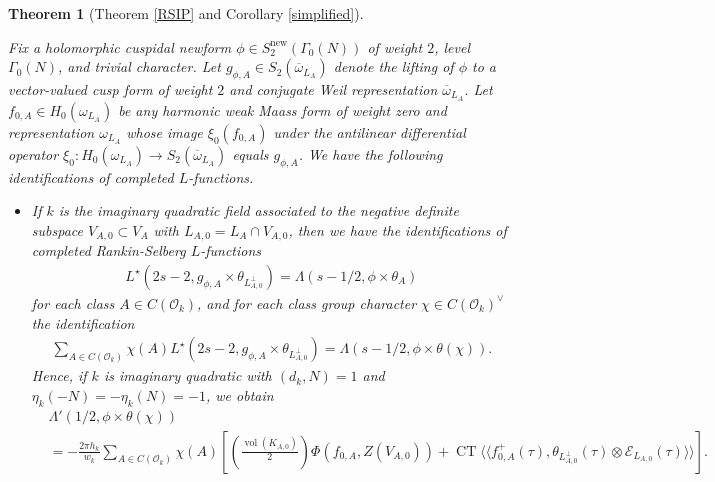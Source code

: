 \documentclass{amsart}
\newtheorem{theorem}{Theorem}[section]
\theoremstyle{definition}
\theoremstyle{definition}
\theoremstyle{definition}
\begin{document}
\begin{theorem}[Theorem \ref{RSIP} and Corollary \ref{simplified}]\label{Rankin-Selberg} 

Fix a holomorphic cuspidal newform $\phi \in S^{\operatorname{new}}_2(\Gamma_0(N))$ of weight $2$, level $\Gamma_0(N)$, and trivial character. 
Let $g_{\phi, A} \in S_2(\overline{\omega}_{L_A})$ denote the lifting of $\phi$ to a vector-valued cusp form of weight $2$ 
and conjugate Weil representation $\overline{\omega}_{L_A}$. Let $f_{0, A} \in H_{0}(\omega_{L_A})$ be any harmonic weak
Maass form of weight zero and representation $\omega_{L_A}$ whose image $\xi_0(f_{0, A})$ under the antilinear differential 
operator $\xi_0: H_0(\omega_{L_A}) \rightarrow S_2(\overline{\omega}_{L_A})$ equals $g_{\phi, A}$.
We have the following identifications of completed $L$-functions. \\

\begin{itemize}

\item[(i)] If $k$ is the imaginary quadratic field associated to the negative definite subspace $V_{A, 0} \subset V_A$
with $L_{A,0} = L_A \cap V_{A,0}$, then we have the identifications of completed Rankin-Selberg $L$-functions 
\begin{align*} L^{\star}(2s-2, g_{\phi, A} \times \theta_{L_{A, 0}^{\perp}}) 
= \Lambda(s-1/2, \phi \times \theta_A) \end{align*} 
for each class $A \in C(\mathcal{O}_k)$, and for each class group character $\chi \in C(\mathcal{O}_k)^{\vee}$ the identification 
\begin{align*} \sum\limits_{A \in C(\mathcal{O}_k)} \chi(A) L^{\star}(2s-2, g_{\phi, A} \times \theta_{L_{A, 0}^{\perp}}) 
= \Lambda(s-1/2, \phi \times \theta(\chi)). \end{align*} 
Hence, if $k$ is imaginary quadratic with $(d_k, N)=1$ and $\eta_k(-N) = -\eta_k(N) = -1$, we obtain 
\begin{align*} & \Lambda'(1/2, \phi \times \theta(\chi))  \\
&=- \frac{2 \pi h_k}{w_k} \sum\limits_{A \in C(\mathcal{O}_k)} \chi(A) 
\left[ \left(   \frac{\operatorname{vol}(K_{A,0})  }{ 2} \right) \Phi(f_{0, A}, Z(V_{A, 0})) 
+ \operatorname{CT} \langle \langle f_{0, A}^+(\tau), \theta_{L_{A, 0}^{\perp}}(\tau) \otimes \mathcal{E}_{L_{A, 0}}(\tau) \rangle \rangle \right]. \end{align*} \\


\end{itemize}
\end{theorem}
\end{document}
